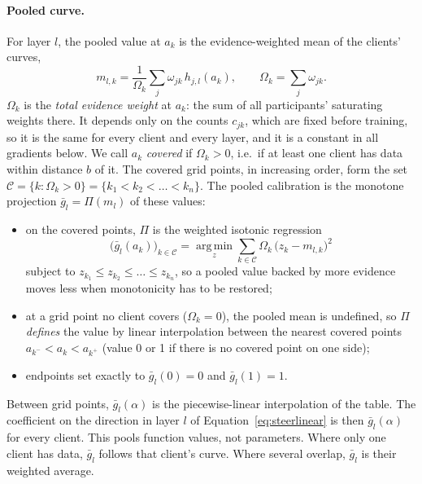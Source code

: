 \documentclass[11pt]{article}
\begin{document}
\paragraph{Pooled curve.}
For layer $l$, the pooled value at $a_k$ is the evidence-weighted mean of the clients' curves,
\begin{equation}
  m_{l,k} = \frac{1}{\Omega_k}\sum_{j} \omega_{jk}\, h_{j,l}(a_k),
  \qquad
  \Omega_k = \sum_{j} \omega_{jk} .
  \label{eq:pooled-mean}
\end{equation}
$\Omega_k$ is the \emph{total evidence weight} at $a_k$: the sum of all participants' saturating weights there.
It depends only on the counts $c_{jk}$, which are fixed before training, so it is the same for every client and every layer, and it is a constant in all gradients below.
We call $a_k$ \emph{covered} if $\Omega_k>0$, i.e.\ if at least one client has data within distance $b$ of it.
The covered grid points, in increasing order, form the set $\mathcal{C}=\{k:\Omega_k>0\}=\{k_1<k_2<\dots<k_n\}$.
The pooled calibration is the monotone projection $\bar g_l = \Pi(m_l)$ of these values:
\begin{itemize}
  \item on the covered points, $\Pi$ is the weighted isotonic regression
  \begin{equation}
    \bigl(\bar g_l(a_k)\bigr)_{k\in\mathcal{C}} = \operatorname*{arg\,min}_{z} \sum_{k\in\mathcal{C}} \Omega_k\,\bigl(z_k-m_{l,k}\bigr)^2
    \label{eq:isotonic}
  \end{equation}
  subject to $z_{k_1}\le z_{k_2}\le\dots\le z_{k_n}$, so a pooled value backed by more evidence moves less when monotonicity has to be restored;
  \item at a grid point no client covers ($\Omega_k=0$), the pooled mean is undefined, so $\Pi$ \emph{defines} the value by linear interpolation between the nearest covered points $a_{k^-}<a_k<a_{k^+}$ (value 0 or 1 if there is no covered point on one side);
  \item endpoints set exactly to $\bar g_l(0)=0$ and $\bar g_l(1)=1$.
\end{itemize}
Between grid points, $\bar g_l(\alpha)$ is the piecewise-linear interpolation of the table.
The coefficient on the direction in layer $l$ of Equation~\ref{eq:steerlinear} is then $\bar g_l(\alpha)$ for every client.
This pools function values, not parameters.
Where only one client has data, $\bar g_l$ follows that client's curve.
Where several overlap, $\bar g_l$ is their weighted average.
\end{document}
